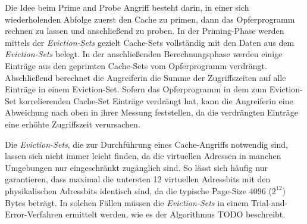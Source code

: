 Die Idee beim Prime and Probe Angriff besteht darin, in einer sich wiederholenden Abfolge zuerst den Cache zu primen, dann das Opferprogramm rechnen zu lassen und anschließend zu proben.
In der Priming-Phase werden mittels der \textit{Eviction-Sets} gezielt Cache-Sets vollständig mit den Daten aus dem \textit{Eviction-Sets} belegt.
In der anschließenden Berechnungsphase werden einige Einträge aus den geprimten Cache-Sets vom Opferprogramm verdrängt. Abschließend berechnet die Angreiferin die Summe der Zugriffszeiten auf alle Einträge in einem Eviction-Set.
Sofern das Opferprogramm in dem zum Eviction-Set korrelierenden Cache-Set Einträge verdrängt hat, kann die Angreiferin eine Abweichung nach oben in ihrer Messung feststellen, da die verdrängten Einträge eine erhöhte Zugriffszeit verursachen. 

Die \textit{Eviction-Sets}, die zur Durchführung eines Cache-Angriffs notwendig sind, lassen sich nicht immer leicht finden, da die virtuellen Adressen in manchen Umgebungen nur eingeschränkt zugänglich sind. 
So lässt sich häufig nur garantieren, dass maximal die untersten 12 virtuellen Adressbits mit den physikalischen Adressbits identisch sind, da die typische Page-Size 4096 ($2^{12}$) Bytes beträgt. 
In solchen Fällen müssen die \textit{Eviction-Sets} in einem Trial-and-Error-Verfahren ermittelt werden, wie es der Algorithmus TODO %
beschreibt.


